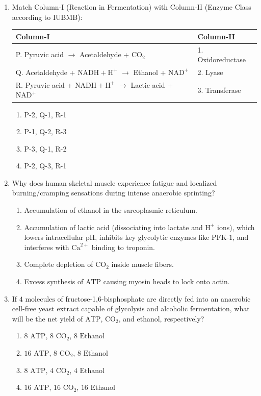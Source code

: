 \documentclass[11pt, a4paper]{article}
\begin{document}
\begin{enumerate}[label=\textbf{\arabic*.}]
\item Match Column-I (Reaction in Fermentation) with Column-II (Enzyme Class according to IUBMB):
\begin{center}
\begin{tabular}{|l|l|}
\hline
\textbf{Column-I} & \textbf{Column-II} \\
\hline
P. Pyruvic acid $\rightarrow$ Acetaldehyde + $\text{CO}_2$ & 1. Oxidoreductase \\
Q. Acetaldehyde + $\text{NADH} + \text{H}^+$ $\rightarrow$ Ethanol + $\text{NAD}^+$ & 2. Lyase \\
R. Pyruvic acid + $\text{NADH} + \text{H}^+$ $\rightarrow$ Lactic acid + $\text{NAD}^+$ & 3. Transferase \\
\hline
\end{tabular}
\end{center}
\begin{enumerate}[label=(\Alph*)]
    \item P-2, Q-1, R-1
    \item P-1, Q-2, R-3
    \item P-3, Q-1, R-2
    \item P-2, Q-3, R-1
\end{enumerate}

\item Why does human skeletal muscle experience fatigue and localized burning/cramping sensations during intense anaerobic sprinting?
\begin{enumerate}[label=(\Alph*)]
    \item Accumulation of ethanol in the sarcoplasmic reticulum.
    \item Accumulation of lactic acid (dissociating into lactate and $\text{H}^+$ ions), which lowers intracellular pH, inhibits key glycolytic enzymes like $\text{PFK-1}$, and interferes with $\text{Ca}^{2+}$ binding to troponin.
    \item Complete depletion of $\text{CO}_2$ inside muscle fibers.
    \item Excess synthesis of $\text{ATP}$ causing myosin heads to lock onto actin.
\end{enumerate}

\item If $4\text{ molecules}$ of fructose-1,6-bisphosphate are directly fed into an anaerobic cell-free yeast extract capable of glycolysis and alcoholic fermentation, what will be the net yield of $\text{ATP}$, $\text{CO}_2$, and ethanol, respectively?
\begin{enumerate}[label=(\Alph*)]
    \item $8\text{ ATP}$, $8\text{ CO}_2$, $8\text{ Ethanol}$
    \item $16\text{ ATP}$, $8\text{ CO}_2$, $8\text{ Ethanol}$
    \item $8\text{ ATP}$, $4\text{ CO}_2$, $4\text{ Ethanol}$
    \item $16\text{ ATP}$, $16\text{ CO}_2$, $16\text{ Ethanol}$
\end{enumerate}


\end{enumerate}
\end{document}
